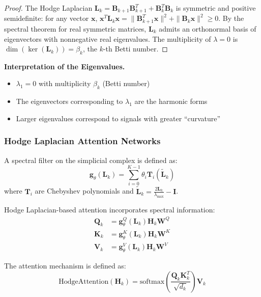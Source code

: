 \begin{proof}
The Hodge Laplacian $\mathbf{L}_k = \mathbf{B}_{k+1}\mathbf{B}_{k+1}^T + \mathbf{B}_k^T\mathbf{B}_k$ is symmetric and positive semidefinite: for any vector $\mathbf{x}$, $\mathbf{x}^T \mathbf{L}_k \mathbf{x} = \|\mathbf{B}_{k+1}^T \mathbf{x}\|^2 + \|\mathbf{B}_k \mathbf{x}\|^2 \geq 0$. By the spectral theorem for real symmetric matrices, $\mathbf{L}_k$ admits an orthonormal basis of eigenvectors with nonnegative real eigenvalues. The multiplicity of $\lambda = 0$ is $\dim(\ker(\mathbf{L}_k)) = \beta_k$, the $k$-th Betti number.
\end{proof}

\textbf{Interpretation of the Eigenvalues.}\label{rem:interpretacion_autovalores_hodge}
\begin{itemize}
    \item $\lambda_1 = 0$ with multiplicity $\beta_k$ (Betti number)
    \item The eigenvectors corresponding to $\lambda_1$ are the harmonic forms
    \item Larger eigenvalues correspond to signals with greater ``curvature''
\end{itemize}

\subsubsection{Hodge Laplacian Attention Networks}

\begin{definition}\label{def:filtro_espectral_hodge}
A spectral filter on the simplicial complex is defined as:
\begin{equation}
    \mathbf{g}_{\theta}(\mathbf{L}_k) = \sum_{i=0}^{K-1} \theta_i \mathbf{T}_i(\tilde{\mathbf{L}}_k)
\end{equation}
where $\mathbf{T}_i$ are Chebyshev polynomials and $\tilde{\mathbf{L}}_k = \frac{2\mathbf{L}_k}{\lambda_{\max}} - \mathbf{I}$.
\end{definition}

\begin{definition}\label{def:hodge_laplacian_attention}
Hodge Laplacian-based attention incorporates spectral information:
\begin{align}
    \mathbf{Q}_k &= \mathbf{g}_{\theta}^Q(\mathbf{L}_k) \mathbf{H}_k \mathbf{W}^Q \\
    \mathbf{K}_k &= \mathbf{g}_{\theta}^K(\mathbf{L}_k) \mathbf{H}_k \mathbf{W}^K \\
    \mathbf{V}_k &= \mathbf{g}_{\theta}^V(\mathbf{L}_k) \mathbf{H}_k \mathbf{W}^V
\end{align}

The attention mechanism is defined as:
\begin{equation}
    \text{HodgeAttention}(\mathbf{H}_k) = \text{softmax}\left(\frac{\mathbf{Q}_k \mathbf{K}_k^T}{\sqrt{d_k}}\right) \mathbf{V}_k
\end{equation}
\end{definition}

